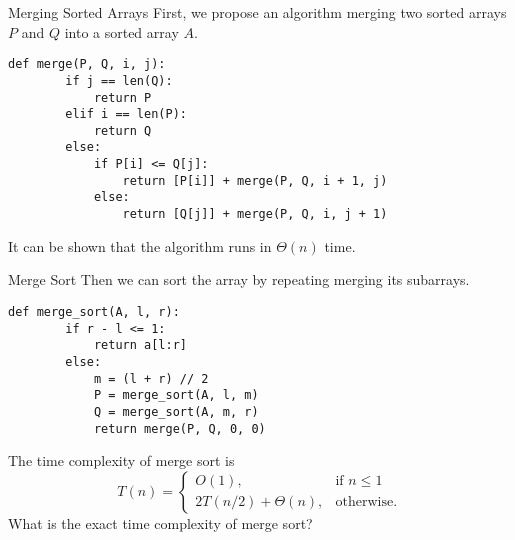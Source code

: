 \documentclass{beamer}
\begin{document}
\begin{frame}[fragile]{Merging Sorted Arrays}
  First, we propose an algorithm merging two sorted arrays $P$ and $Q$ into
  a sorted array $A$. \pause
  \begin{block}{}
    \scriptsize
    \begin{lstlisting}[gobble=4]
    def merge(P, Q, i, j):
        if j == len(Q):
            return P
        elif i == len(P):
            return Q
        else:
            if P[i] <= Q[j]:
                return [P[i]] + merge(P, Q, i + 1, j)
            else:
                return [Q[j]] + merge(P, Q, i, j + 1)
    \end{lstlisting}
  \end{block}
  \begin{center}
    \pause
  \end{center}
  It can be shown that the algorithm runs in $\Theta(n)$ time.
\end{frame}

\begin{frame}[fragile]{Merge Sort}
  Then we can sort the array by repeating merging its subarrays.
  \begin{block}{}
    \scriptsize
    \begin{lstlisting}[gobble=4]
    def merge_sort(A, l, r):
        if r - l <= 1:
            return a[l:r]
        else:
            m = (l + r) // 2
            P = merge_sort(A, l, m)
            Q = merge_sort(A, m, r)
            return merge(P, Q, 0, 0)
    \end{lstlisting}
    \pause
  \end{block}
  The time complexity of merge sort is
  \begin{equation*}
    T(n) =
    \begin{cases}
      O(1), & \text{if $n \leq 1$} \\
      2T(n / 2) + \Theta(n), & \text{otherwise}.
    \end{cases}
  \end{equation*}
  \pause
  What is the exact time complexity of merge sort?
\end{frame}
\end{document}
